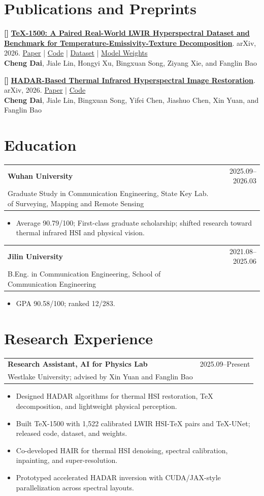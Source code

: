 \documentclass[10pt,letterpaper]{article}
\makeatletter
\newcommand{\heading}[4]{%
  \begin{tabularx}{\textwidth}{@{}Xr@{}}
    \textbf{#1} & {\color{muted}#2}\\[-0.18em]
    {\footnotesize\color{muted}#3} & {\footnotesize\color{muted}#4}
  \end{tabularx}\vspace{-0.15em}
}
\newcounter{pubnum}
\newcommand{\pub}[4]{%
  \refstepcounter{pubnum}%
  \textbf{[\thepubnum]} \textbf{#1}. {\color{muted}#2}. {\small #4}\\[-0.08em]
  \hspace*{1.45em}#3\vspace{0.62em}
}
\makeatother
\begin{document}
\section{Publications and Preprints}
\pub{\href{https://arxiv.org/abs/2606.03806}{TeX-1500: A Paired Real-World LWIR Hyperspectral Dataset and Benchmark for Temperature-Emissivity-Texture Decomposition}}{arXiv, 2026}{\textbf{Cheng Dai}, Jiale Lin, Hongyi Xu, Bingxuan Song, Ziyang Xie, and Fanglin Bao}{\href{https://arxiv.org/abs/2606.03806}{Paper} \;|\; \href{https://github.com/dccc2025/TeX-1500}{Code} \;|\; \href{https://huggingface.co/datasets/jialelin2007/TeX-1500}{Dataset} \;|\; \href{https://huggingface.co/dccc2025/TeX-UNet}{Model Weights}}

\pub{\href{https://arxiv.org/abs/2605.13664}{HADAR-Based Thermal Infrared Hyperspectral Image Restoration}}{arXiv, 2026}{\textbf{Cheng Dai}, Jiale Lin, Bingxuan Song, Yifei Chen, Jiashuo Chen, Xin Yuan, and Fanglin Bao}{\href{https://arxiv.org/abs/2605.13664}{Paper} \;|\; \href{https://github.com/jialelin2007/HAIR}{Code}}

\section{Education}
\heading{Wuhan University}{2025.09--2026.03}{Graduate Study in Communication Engineering, State Key Lab. of Surveying, Mapping and Remote Sensing}{}
\begin{itemize}
  \item Average 90.79/100; First-class graduate scholarship; shifted research toward thermal infrared HSI and physical vision.
\end{itemize}
\vspace{0.55em}

\heading{Jilin University}{2021.08--2025.06}{B.Eng. in Communication Engineering, School of Communication Engineering}{}
\begin{itemize}
  \item GPA 90.58/100; ranked 12/283.
\end{itemize}

\section{Research Experience}
\heading{Research Assistant, AI for Physics Lab}{2025.09--Present}{Westlake University; advised by Xin Yuan and Fanglin Bao}{}
\begin{itemize}
  \item Designed HADAR algorithms for thermal HSI restoration, TeX decomposition, and lightweight physical perception.
  \item Built TeX-1500 with 1,522 calibrated LWIR HSI-TeX pairs and TeX-UNet; released code, dataset, and weights.
  \item Co-developed HAIR for thermal HSI denoising, spectral calibration, inpainting, and super-resolution.
  \item Prototyped accelerated HADAR inversion with CUDA/JAX-style parallelization across spectral layouts.
\end{itemize}
\end{document}
